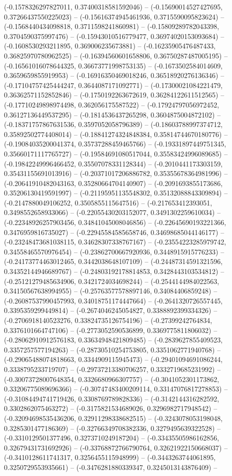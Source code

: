 (-0.1578326297827011, 0.37400318581592046) -- (-0.15690014527427695, 0.37266437550225023) -- (-0.15616374945461936, 0.3715590095823624) -- (-0.1568440434098818, 0.3711598241860981) -- (-0.15809289782043398, 0.3704590375997476) -- (-0.15943010516779477, 0.36974020153093684) -- (-0.1608530293211895, 0.369006235673881) -- (-0.16235905476487433, 0.36825970780962525) -- (-0.16394560601658806, 0.36750287487005195) -- (-0.16561016078644325, 0.36673771998753135) -- (-0.1673502584014609, 0.3659659855919953) -- (-0.16916350469018246, 0.36518920276136346) -- (-0.17104757425444247, 0.3644087171092771) -- (-0.17300021084221479, 0.36362571152852846) -- (-0.1750192263672619, 0.36284122611512565) -- (-0.17710249898974498, 0.362056175587522) -- (-0.17924797056972452, 0.36127136449537295) -- (-0.1814536437265298, 0.3604875004872102) -- (-0.18371757867631536, 0.3597052058796389) -- (-0.18603788997374712, 0.35892502774408014) -- (-0.18841274324848384, 0.35814744670180776) -- (-0.19084035200041374, 0.35737288459465766) -- (-0.19331897449751345, 0.35660171117765727) -- (-0.19584691080517044, 0.35583424996089685) -- (-0.19842249996466452, 0.35507078331128344) -- (-0.2010441173303159, 0.35431155691013916) -- (-0.20371017206886782, 0.35355678364981996) -- (-0.20641910482043163, 0.35280664704140907) -- (-0.2091693855173686, 0.35206130419591997) -- (-0.21195951135548302, 0.35132088843309894) -- (-0.2147880049106252, 0.3505855115647516) -- (-0.217653412393051, 0.3498552658933066) -- (-0.22055430203152077, 0.3491302259610034) -- (-0.22348926257903456, 0.34841045008046856) -- (-0.22645690193221366, 0.3476959816735027) -- (-0.22945584585658746, 0.34698685044146177) -- (-0.23248473681038115, 0.34628307338767167) -- (-0.23554223285979742, 0.34558465570976454) -- (-0.23862700667920936, 0.3448915915776233) -- (-0.24173774463012465, 0.3442038648107109) -- (-0.24487314591321596, 0.34352144946689767) -- (-0.24803192178814853, 0.3428443103534812) -- (-0.25121279485634906, 0.3421724034698244) -- (-0.2544144984022563, 0.34150567638994955) -- (-0.25763577578897146, 0.34084406859248) -- (-0.26087537990457993, 0.34018751174447664) -- (-0.2641320726557445, 0.3395359299449814) -- (-0.2674046245054827, 0.3388892399334326) -- (-0.2706918140523276, 0.33824735126754196) -- (-0.27399242764834, 0.3376101664747106) -- (-0.2773052590536899, 0.3369775811806032) -- (-0.28062910912576183, 0.33634948421809485) -- (-0.2839627855409523, 0.3357257577194263) -- (-0.28730510254753805, 0.3351062771940768) -- (-0.29065488074818663, 0.3344909115945473) -- (-0.29401094691086244, 0.3338795233719707) -- (-0.29737213380706257, 0.3332719685231992) -- (-0.30073728007648354, 0.3326680966307757) -- (-0.3041052301173862, 0.33206775089696366) -- (-0.30747483400209114, 0.33147076817278853) -- (-0.31084494741719426, 0.3308769789828336) -- (-0.3142144316282592, 0.3302862075463272) -- (-0.3175821534689026, 0.3296982717948542) -- (-0.32094698535436206, 0.32911298338682515) -- (-0.3243078053198048, 0.3285301477186369) -- (-0.32766349708382336, 0.3279495639322528) -- (-0.3310129501377496, 0.3273710249187204) -- (-0.33435505986162856, 0.32679431731692926) -- (-0.33768872766790764, 0.32621922150668037) -- (-0.3410128611741317, 0.3256455115948999) -- (-0.3443263744061895, 0.3250729553935661) -- (-0.3476281880339347, 0.3245013143876409) -- 